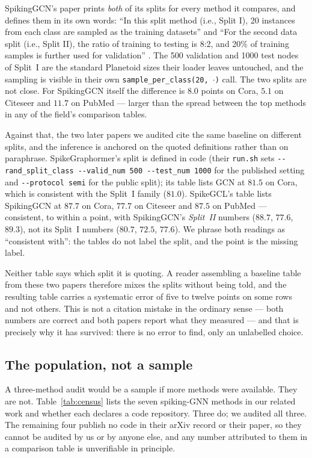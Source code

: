 \documentclass[10pt,twocolumn]{article}
\newcommand{\tabref}[1]{Table~\ref{#1}}
\begin{document}
SpikingGCN's paper prints \emph{both} of its splits for every method it compares, and defines them
in its own words: ``In this split method (i.e., Split I), 20 instances from each class are sampled
as the training datasets'' and ``For the second data split (i.e., Split II), the ratio of training
to testing is 8:2, and 20\% of training samples is further used for validation''
\citep{zhu2022spiking}. The 500 validation and 1000 test nodes of Split~I are the standard
Planetoid sizes their loader leaves untouched, and the sampling is visible in their own
\texttt{sample\_per\_class(20, $\cdot$)} call. The two splits are not close. For SpikingGCN itself
the difference is $8.0$ points on Cora, $5.1$ on Citeseer and $11.7$ on PubMed --- larger than the
spread between the top methods in any of the field's comparison tables.

Against that, the two later papers we audited cite the same baseline on different splits, and the
inference is anchored on the quoted definitions rather than on paraphrase. SpikeGraphormer's split
is defined in code (their \texttt{run.sh} sets \texttt{-{-}rand\_split\_class -{-}valid\_num 500
-{-}test\_num 1000} for the published setting and \texttt{-{-}protocol semi} for the public split);
its table lists GCN at $81.5$ on Cora, which is consistent with the Split~I family ($81.0$).
SpikeGCL's table lists SpikingGCN at $87.7$ on Cora, $77.7$ on Citeseer and $87.5$ on PubMed ---
consistent, to within a point, with SpikingGCN's \emph{Split~II} numbers ($88.7$, $77.6$, $89.3$),
not its Split~I numbers ($80.7$, $72.5$, $77.6$). We phrase both readings as ``consistent with'':
the tables do not label the split, and the point is the missing label.

Neither table says which split it is quoting. A reader assembling a baseline table from these two
papers therefore mixes the splits without being told, and the resulting table carries a systematic
error of five to twelve points on some rows and not others. This is not a citation mistake in the
ordinary sense --- both numbers are correct and both papers report what they measured --- and that is
precisely why it has survived: there is no error to find, only an unlabelled choice.

\subsection{The population, not a sample}
\label{sec:census}


A three-method audit would be a sample if more methods were available. They are not.
\tabref{tab:census} lists the seven spiking-GNN methods in our related work and whether each declares
a code repository. Three do; we audited all three. The remaining four publish no code in their arXiv
record or their paper, so they cannot be audited by us or by anyone else, and any number attributed
to them in a comparison table is unverifiable in principle.
\end{document}

